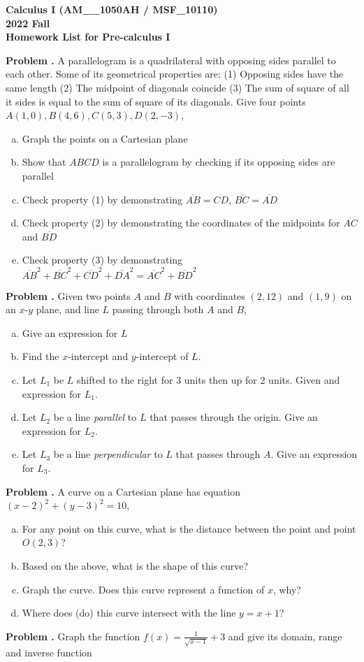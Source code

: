 \documentclass[11pt,letterpaper]{article}
\newcounter{problem}
\newcommand{\problem}{
	\stepcounter{problem}%
	\noindent \textbf{Problem \theproblem. }%
}
\begin{document}
\noindent\textbf{\large Calculus I (AM\_\_1050AH / MSF\_10110) \\ 2022 Fall \\ Homework List for Pre-calculus I}

\bigskip

\problem A parallelogram is a quadrilateral with opposing sides parallel to each other.  Some of its geometrical properties are: (1) Opposing sides have the same length (2) The midpoint of diagonals coincide (3) The sum of square of all it sides is equal to the sum of square of its diagonals. Give four points $A (1, 0), B (4, 6), C (5, 3), D (2, -3)$,
\begin{enumerate}[(a)]
    \item Graph the points on a Cartesian plane
    \item Show that $ABCD$ is a parallelogram by checking if its opposing sides are parallel
    \item Check property (1) by demonstrating $\overline{AB} = \overline{CD}$, $\overline{BC} = \overline{AD}$
    \item Check property (2) by demonstrating the coordinates of the midpoints for $\overline{AC}$ and $\overline{BD}$
    \item Check property (3) by demonstrating $\overline{AB}^2 + \overline{BC}^2 + \overline{CD}^2 + \overline{DA}^2 = \overline{AC}^2 + \overline{BD}^2$
\end{enumerate} \vspace{6mm}

\problem Given two points $A$ and $B$ with coordinates $(2, 12)$ and $(1, 9)$ on an $x$-$y$ plane, and line $L$ passing through both $A$ and $B$,
	\begin{enumerate}[(a)]
	\item Give an expression for $L$
	\item Find the $x$-intercept and $y$-intercept of $L$.
	\item Let $L_1$ be $L$ shifted to the right for 3 units then up for 2 units. Given and expression for $L_1$.
	\item Let $L_2$ be a line \textit{parallel} to $L$ that passes through the origin. Give an expression for $L_2$.
	\item Let $L_3$ be a line \textit{perpendicular} to $L$ that passes through $A$. Give an expression for $L_3$.
	\end{enumerate} \vspace{6mm}

\problem A curve on a Cartesian plane has equation $(x-2)^2+(y-3)^2 = 10$,
	\begin{enumerate}[(a)]
	\item For any point on this curve, what is the distance between the point and point $O(2, 3)$?
	\item Based on the above, what is the shape of this curve?
	\item Graph the curve. Does this curve represent a function of $x$, why?
	\item Where does (do) this curve intersect with the line $y = x + 1$?
	\end{enumerate} \vspace{6mm}

\problem Graph the function $f(x) = \frac{1}{\sqrt{x-1}} + 3$ and give its domain, range and inverse function \vspace{6mm}
\end{document}
